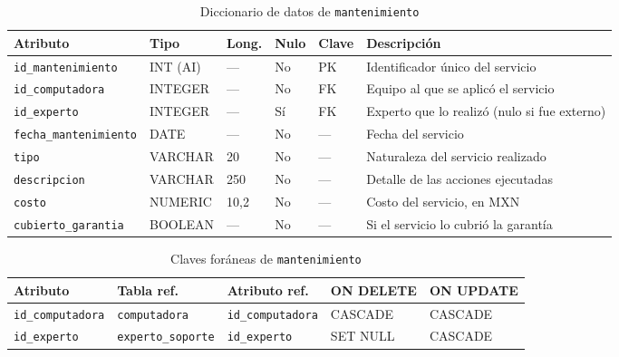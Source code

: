 \documentclass[10pt,a4paper]{article}
\begin{document}
\begin{table}[H]
	\centering
	\footnotesize
	\begin{tabular}{p{3.1cm} | p{1.6cm} | p{0.8cm} | p{0.7cm} | p{1cm} | p{7cm}}\hline \hline
		\textbf{Atributo} & \textbf{Tipo} & \textbf{Long.} & \textbf{Nulo} & \textbf{Clave} & \textbf{Descripción} \\ \hline \hline
		\texttt{id\_mantenimiento} & INT (AI) & --- & No & PK & Identificador único del servicio \\ \hline
		\texttt{id\_computadora} & INTEGER & --- & No & FK & Equipo al que se aplicó el servicio \\ \hline
		\texttt{id\_experto} & INTEGER & --- & Sí & FK & Experto que lo realizó (nulo si fue externo) \\ \hline
		\texttt{fecha\_mantenimiento} & DATE & --- & No & --- & Fecha del servicio \\ \hline
		\texttt{tipo} & VARCHAR & 20 & No & --- & Naturaleza del servicio realizado \\ \hline
		\texttt{descripcion} & VARCHAR & 250 & No & --- & Detalle de las acciones ejecutadas \\ \hline
		\texttt{costo} & NUMERIC & 10,2 & No & --- & Costo del servicio, en MXN \\ \hline
		\texttt{cubierto\_garantia} & BOOLEAN & --- & No & --- & Si el servicio lo cubrió la garantía \\ \hline \hline
	\end{tabular}
	\caption{Diccionario de datos de \texttt{mantenimiento}}
	\label{tabla:dic-mantenimiento}
\end{table}

\begin{table}[H]
	\centering
	\footnotesize
	\begin{tabular}{p{3.6cm} | p{3.4cm} | p{3.4cm} | p{1.5cm} | p{1.5cm}}\hline \hline
		\textbf{Atributo} & \textbf{Tabla ref.} & \textbf{Atributo ref.} & \textbf{ON DELETE} & \textbf{ON UPDATE} \\ \hline \hline
		\texttt{id\_computadora} & \texttt{computadora} & \texttt{id\_computadora} & CASCADE & CASCADE \\ \hline
		\texttt{id\_experto} & \texttt{experto\_soporte} & \texttt{id\_experto} & SET NULL & CASCADE \\ \hline \hline
	\end{tabular}
	\caption{Claves foráneas de \texttt{mantenimiento}}
	\label{tabla:fk-mantenimiento}
\end{table}
\end{document}

